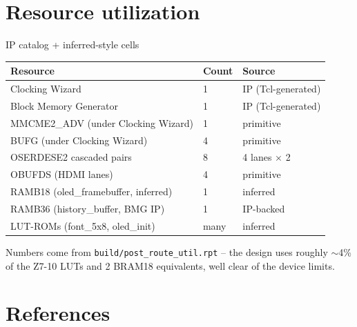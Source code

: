 \documentclass[aspectratio=169,10pt]{beamer}
\begin{document}
\section{Resource utilization}

\begin{frame}{IP catalog + inferred-style cells}
    \small
    \begin{tabular}{l l l}
        \toprule
        Resource & Count & Source \\
        \midrule
        Clocking Wizard      & 1  & IP (Tcl-generated)        \\
        Block Memory Generator & 1 & IP (Tcl-generated)        \\
        MMCME2\_ADV (under Clocking Wizard) & 1 & primitive    \\
        BUFG (under Clocking Wizard)        & 4 & primitive    \\
        OSERDESE2 cascaded pairs            & 8 & 4 lanes $\times$ 2  \\
        OBUFDS (HDMI lanes)                 & 4 & primitive    \\
        RAMB18 (oled\_framebuffer, inferred) & 1 & inferred    \\
        RAMB36 (history\_buffer, BMG IP)    & 1 & IP-backed    \\
        LUT-ROMs (font\_5x8, oled\_init)    & many & inferred  \\
        \bottomrule
    \end{tabular}
    \vspace{2mm}

    \scriptsize Numbers come from \texttt{build/post\_route\_util.rpt} --
    the design uses roughly $\sim$4\% of the Z7-10 LUTs and 2 BRAM18
    equivalents, well clear of the device limits.
\end{frame}

\section{References}
\end{document}
